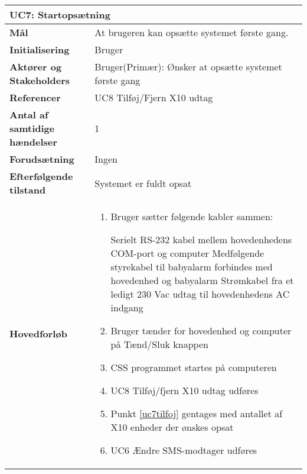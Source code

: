 \begin{table}[H] \centering
	\begin{tabular}{|p{6cm}|p{8cm}|}
	\hline
		\multicolumn{2}{|l|}{\textbf{UC7: Startopsætning}} \\\hline
		
		\textbf{Mål}							&At brugeren kan opsætte systemet første gang.					\\\hline
		\textbf{Initialisering}				&Bruger					 										\\\hline
		\textbf{Aktører og Stakeholders}		&Bruger(Primær): Ønsker at opsætte systemet første gang			\\\hline
		\textbf{Referencer}					&UC8 Tilføj/Fjern X10 udtag										\\\hline
		\textbf{Antal af samtidige hændelser}&1 																\\\hline
		\textbf{Forudsætning}				&Ingen															\\\hline
		\textbf{Efterfølgende tilstand}		&Systemet er fuldt opsat											\\\hline
		\textbf{Hovedforløb}					
			&\begin{enumerate}
	
				\item Bruger sætter følgende kabler sammen:
				
					\subitem Serielt RS-232 kabel mellem hovedenhedens COM-port og computer
					\subitem Medfølgende styrekabel til babyalarm forbindes med hovedenhed og babyalarm
					\subitem Strømkabel fra et ledigt 230 Vac udtag til hovedenhedens AC indgang
				
				\item Bruger tænder for hovedenhed og computer på Tænd/Sluk knappen
				
				\item CSS programmet startes på computeren
				
				\item \label{uc7tilfoj} UC8 Tilføj/fjern X10 udtag udføres
				
				\item Punkt \ref{uc7tilfoj} gentages med antallet af X10 enheder der ønskes opsat
				
				\item \label{uc7sms} UC6 Ændre SMS-modtager udføres
																													
			\end{enumerate}\\\hline
											
	\end{tabular}
	\label{UC7} 
\end{table}